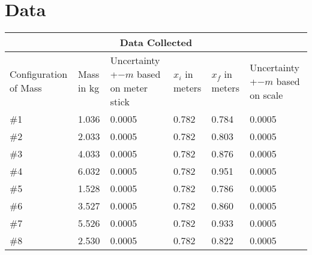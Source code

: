 \chapter{Data}

\begin{tabular}{ |p{2cm}|p{2cm}|p{2cm}|p{2cm}|p{2cm}|p{2cm}| }
  \hline
  \multicolumn{6}{|c|}{Data Collected} \\
  \hline
  Configuration of Mass & Mass in kg & Uncertainty +$-m$ based on meter stick& $x_i$ in meters & $x_f$ in meters & Uncertainty +$-m$ based on scale\\
  \hline
  \#1& 1.036 &  0.0005 & 0.782 & 0.784 & 0.0005\\
  \hline
  \#2& 2.033 &  0.0005 & 0.782 & 0.803 & 0.0005\\
  \hline
  \#3& 4.033 &  0.0005 & 0.782 & 0.876 & 0.0005\\
  \hline
  \#4& 6.032 &  0.0005 & 0.782 & 0.951 & 0.0005\\
  \hline
  \#5& 1.528 &  0.0005 & 0.782 & 0.786 & 0.0005\\
  \hline
  \#6& 3.527 &  0.0005 & 0.782 & 0.860 & 0.0005\\
  \hline
  \#7& 5.526 &  0.0005 & 0.782 & 0.933 & 0.0005\\
  \hline
  \#8& 2.530 &  0.0005 & 0.782 & 0.822 & 0.0005\\
  \hline
\end{tabular}
